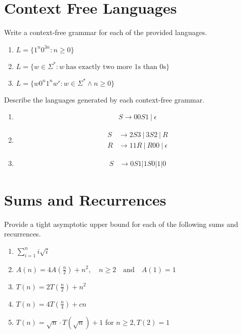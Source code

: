\documentclass[fleqn]{article}
\begin{document}
\section{Context Free Languages}
Write a context-free grammar for each of the provided languages.
\begin{enumerate}
    \item $L = \{1^n 0^{3n} : n \geq 0\}$
    \item $L = \{w \in \Sigma^* : w~\text{has exactly two more }1\text{s than }0\text{s}\}$
    \item $L = \{w 0^n 1^n w^r : w \in \Sigma^* \wedge n \geq 0\}$
\end{enumerate}

\noindent Describe the languages generated by each context-free grammar.
\begin{enumerate}
    \item 
    \[
        \begin{aligned}
            S \to 00 S 1~|~ \epsilon
        \end{aligned}
    \]
    \item 
    \[
        \begin{aligned}
            S &\to 2 S 3~|~ 3 S 2 ~|~ R \\
            R &\to 11R ~|~ R00 ~|~ \epsilon
        \end{aligned}
    \]
    \item
    \[
        \begin{aligned}
            S &\to 0 S 1 | 1 S 0 | 1 | 0
        \end{aligned}
    \]
\end{enumerate}

\section{Sums and Recurrences}
Provide a tight asymptotic upper bound for each of the following sums and recurrences.
\begin{enumerate}
    \item $\sum^n_{i=1} i \sqrt{i}$
    \item $A(n) = 4A\left(\frac{n}{2}\right) + n^2, \quad n \geq 2 \quad \text{and} \quad A(1) = 1$
    \item $T(n) = 2 T\left(\frac{n}{2}\right) + n^2$
    \item $T(n) = 4 T\left(\frac{n}{4}\right) + cn$
    \item $T(n) = \sqrt{n} \cdot T(\sqrt{n}) + 1$ for $n \geq 2, T(2) = 1$
\end{enumerate}
\end{document}
